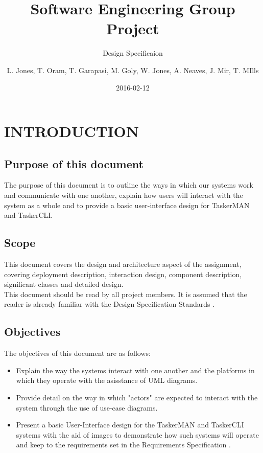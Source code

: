 \documentclass{project}
\begin{document}
\title{Software Engineering Group Project}
\subtitle{Design Specificaion}
\author{L. Jones, T. Oram, T. Garapasi, M. Goly, W. Jones, A. Neaves, J. Mir, T. MIlls}     
\date{2016-02-12}
\maketitle
\tableofcontents
\newpage
\section{INTRODUCTION}
\subsection{Purpose of this document}
The purpose of this document is to outline the ways in which our systems work and communicate with one another, explain how users will interact with the system as a whole and to provide a basic user-interface design for TaskerMAN and TaskerCLI.
\subsection{Scope}
This document covers the design and architecture aspect of the assignment, covering deployment description, interaction design, component description, significant classes and detailed design. \\
\newline
This document should be read by all project members. It is assumed that the reader is already familiar with the Design Specification Standards \cite{se.qa.ds}.
\subsection{Objectives}
The objectives of this document are as follows:
\begin{itemize}
	\item Explain the way the systems interact with one another and the platforms in which they operate with the asisstance of UML diagrams.
	\item Provide detail on the way in which "actors" are expected to interact with the system through the use of use-case diagrams.
	\item Present a basic User-Interface design for the TaskerMAN and TaskerCLI systems with the aid of images to demonstrate how such systems will operate and keep to the requirements set in the Requirements Specification \cite{se.qa.rs}. \\	
\end{itemize} 
\clearpage
\end{document}
